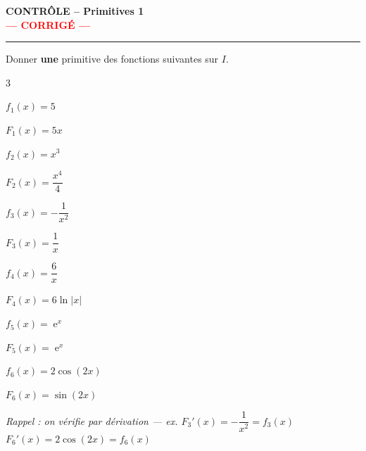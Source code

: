 \documentclass[a4paper,11pt]{article}
\DeclareMathOperator{\e}{e}
\begin{document}
\begin{center}
  {\LARGE\textbf{CONTRÔLE -- Primitives 1}} \\[0.2cm]
  \textcolor{red}{\Large\textbf{--- CORRIGÉ ---}} \\[0.1cm]
  \rule{0.5\textwidth}{0.4pt}
\end{center}

\vspace{0.4cm}

\begin{tcolorbox}[exobox={Exercice 1 \quad Calcul de primitives \hfill \normalfont\textit{(3 points)}}]
  Donner \textbf{une} primitive des fonctions suivantes sur $I$.
\end{tcolorbox}

\begin{multicols}{3}
\begin{center}

$f_1(x) = 5$
\begin{tcolorbox}[corrigebox]
  $F_1(x) = 5x$
\end{tcolorbox}

$f_2(x) = x^3$
\begin{tcolorbox}[corrigebox]
  $F_2(x) = \dfrac{x^4}{4}$
\end{tcolorbox}

$f_3(x) = -\dfrac{1}{x^2}$
\begin{tcolorbox}[corrigebox]
  $F_3(x) = \dfrac{1}{x}$
\end{tcolorbox}

$f_4(x) = \dfrac{6}{x}$
\begin{tcolorbox}[corrigebox]
  $F_4(x) = 6\ln|x|$
\end{tcolorbox}

$f_5(x) = \e^x$
\begin{tcolorbox}[corrigebox]
  $F_5(x) = \e^x$
\end{tcolorbox}

$f_6(x) = 2\cos(2x)$
\begin{tcolorbox}[corrigebox]
  $F_6(x) = \sin(2x)$
\end{tcolorbox}

\end{center}
\end{multicols}

\textit{\small Rappel : on vérifie par dérivation — ex. $F_3'(x) = -\dfrac{1}{x^2} = f_3(x)$ \checkmark \quad $F_6'(x) = 2\cos(2x) = f_6(x)$ \checkmark}
\end{document}
